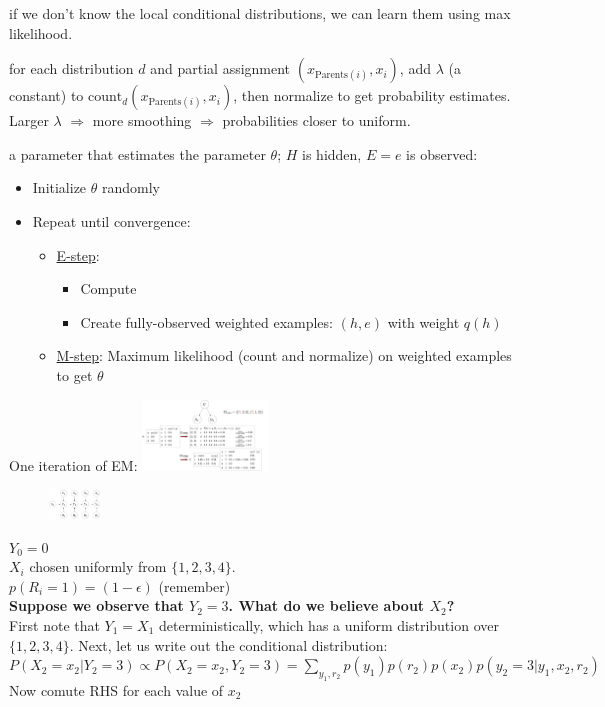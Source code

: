  if we don't know the local conditional distributions,
we can learn them using max likelihood.

 for each distribution $d$ and partial assignment 
$(x_{\text{Parents}(i)}, x_i)$, add $\lambda$ (a constant) to
$\text{count}_{d}(x_{\text{Parents}(i)}, x_i)$, then normalize to get
probability estimates.
Larger $\lambda$ $\Rightarrow$ more smoothing $\Rightarrow$ probabilities closer
to uniform.

 a parameter  that
estimates the parameter $\theta$; $H$ is hidden, $E=e$ is observed:
\begin{itemize}
    \item Initialize $\theta$ randomly
    \item Repeat until convergence:\begin{itemize}
        \item \underline{E-step}:\begin{itemize}
            \item Compute 
            \item Create fully-observed weighted examples: $(h, e)$ with weight
                $q(h)$
        \end{itemize}
        \item \underline{M-step}: Maximum likelihood (count and normalize) on
            weighted examples to get $\theta$
    \end{itemize}
\end{itemize}
One iteration of EM:
\includegraphics[width=0.25\textwidth]{topics/em.jpg}

\begin{figure}
    \includegraphics[width=0.12\textwidth]{topics/Bayesnet_problem.jpg}
\end{figure}
$Y_0 = 0$\\
$X_i$ chosen uniformly from $\{1,2,3,4\}$. \\
$p(R_i = 1) = (1-\epsilon)$ (remember)\\
\textbf{Suppose we observe that $Y_2=3$. What do we believe about $X_2$?}\\
First note that $Y_1=X_1$ deterministically, which has a uniform distribution
over $\{1, 2, 3, 4\}$. Next, let us write out the conditional distribution:
$P(X_2=x_2|Y_2=3) \propto P(X_2=x_2, Y_2=3) = \sum_{y_1,r_2} p(y_1)p(r_2)p(x_2)p(y_2=3|y_1,x_2,r_2)$
Now comute RHS for each value of $x_2$

